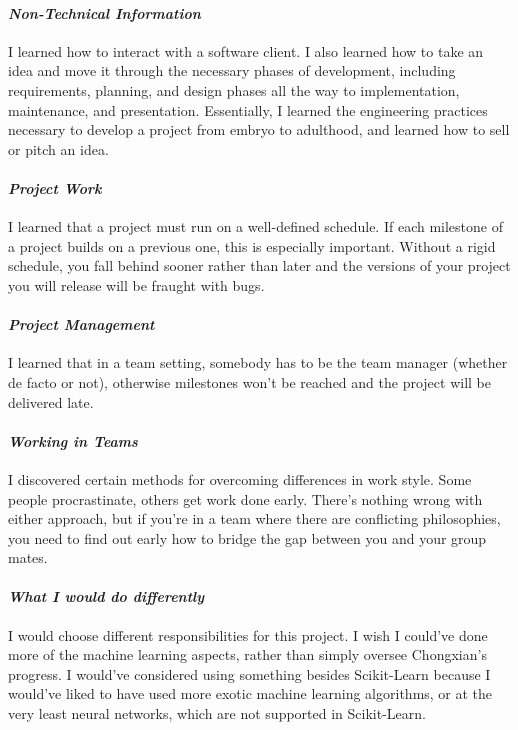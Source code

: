 \documentclass[onecolumn, draftclsnofoot,10pt, compsoc]{IEEEtran}
\begin{document}
\paragraph{\emph{Non-Technical Information}}
I learned how to interact with a software client. I also learned how to take an idea and move it through the necessary phases of development, including requirements, planning, and design phases all the way to implementation, maintenance, and presentation. Essentially, I learned the engineering practices necessary to develop a project from embryo to adulthood, and learned how to sell or pitch an idea.
\paragraph{\emph{Project Work}}
I learned that a project must run on a well-defined schedule. If each milestone of a project builds on a previous one, this is especially important. Without a rigid schedule, you fall behind sooner rather than later and the versions of your project you will release will be fraught with bugs. 

\paragraph{\emph{Project Management}}
I learned that in a team setting, somebody has to be the team manager (whether de facto or not), otherwise milestones won't be reached and the project will be delivered late. 

\paragraph{\emph{Working in Teams}}
I discovered certain methods for overcoming differences in work style. Some people procrastinate, others get work done early. There's nothing wrong with either approach, but if you're in a team where there are conflicting philosophies, you need to find out early how to bridge the gap between you and your group mates.

\paragraph{\emph{What I would do differently}}
I would choose different responsibilities for this project. I wish I could've done more of the machine learning aspects, rather than simply oversee Chongxian's progress. I would've considered using something besides Scikit-Learn  because I would've liked to have used more exotic machine learning algorithms, or at the very least neural networks, which are not supported in Scikit-Learn.
\end{document}
